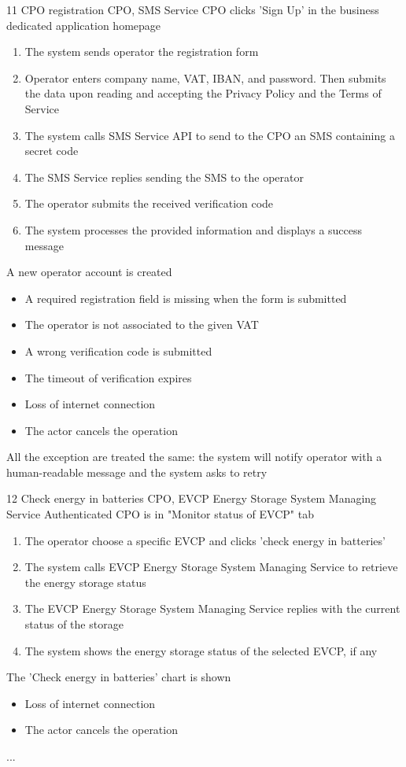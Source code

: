 \usecase
{11}
{CPO registration} %
{CPO, SMS Service} %
{CPO clicks 'Sign Up' in the business dedicated application homepage} %
{ %
    \begin{enumerate}
        \item The system sends operator the registration form
        \item Operator enters company name, VAT, IBAN, and password. Then submits the data upon reading and accepting the Privacy Policy and the Terms of Service
        \item The system calls SMS Service API to send to the CPO an SMS containing a secret code
        \item The SMS Service replies sending the SMS to the operator
        \item The operator submits the received verification code
        \item The system processes the provided information and displays a success message
    \end{enumerate}
}
{A new operator account is created} %
{ %
    \begin{itemize}
        \item A required registration field is missing when the form is submitted
        \item The operator is not associated to the given VAT
        \item A wrong verification code is submitted
        \item The timeout of verification expires
        \item Loss of internet connection
        \item The actor cancels the operation
    \end{itemize}
}
{ %
    All the exception are treated the same: the system will notify operator with a human-readable message and the system asks to retry
}

\usecase
{12}
{Check energy in batteries} %
{CPO, EVCP Energy Storage System Managing Service} %
{Authenticated CPO is in "Monitor status of EVCP" tab} %
{ %
    \begin{enumerate}
        \item The operator choose a specific EVCP and clicks 'check energy in batteries'
        \item The system calls EVCP Energy Storage System Managing Service to retrieve the energy storage status
        \item The EVCP Energy Storage System Managing Service replies with the current status of the storage
        \item The system shows the energy storage status of the selected EVCP, if any
    \end{enumerate}
}
{The 'Check energy in batteries' chart is shown} %
{ %
    \begin{itemize}
        \item Loss of internet connection
        \item The actor cancels the operation
    \end{itemize}
}
{ %
    ...
}

